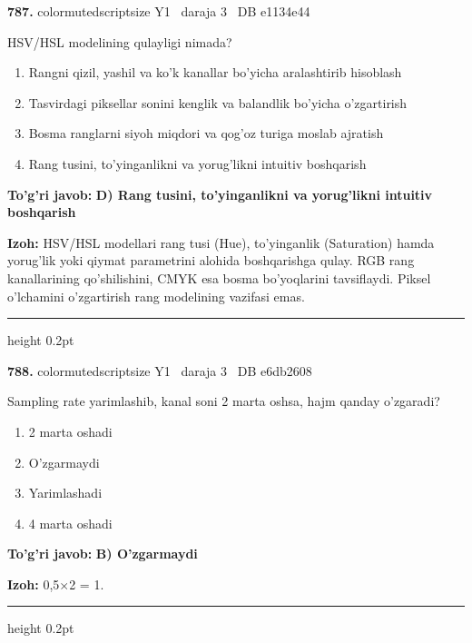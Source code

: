 \documentclass[10pt,a4paper,oneside]{article}
\begin{document}
\noindent\textbf{\color{ink}787.}  {color{muted}scriptsize Y1 \textbullet\ daraja 3 \textbullet\ DB e1134e44}
\par
HSV/HSL modelining qulayligi nimada?
\begin{enumerate}[label=\Alph*),leftmargin=9mm]
\item Rangni qizil, yashil va ko'k kanallar bo'yicha aralashtirib hisoblash
\item Tasvirdagi piksellar sonini kenglik va balandlik bo'yicha o'zgartirish
\item Bosma ranglarni siyoh miqdori va qog'oz turiga moslab ajratish
\item Rang tusini, to'yinganlikni va yorug'likni intuitiv boshqarish
\end{enumerate}
\begin{tcolorbox}[enhanced,breakable,colback=teal!4,colframe=teal!50!black,boxrule=0.5pt,arc=1.1mm,left=3mm,right=3mm,top=1.7mm,bottom=1.7mm,before skip=2mm,after skip=2mm]
\textbf{\color{teal}To'g'ri javob:} \textbf{D) Rang tusini, to'yinganlikni va yorug'likni intuitiv boshqarish}
\par\smallskip
\textbf{Izoh:} HSV/HSL modellari rang tusi (Hue), to'yinganlik (Saturation) hamda yorug'lik yoki qiymat parametrini alohida boshqarishga qulay. RGB rang kanallarining qo'shilishini, CMYK esa bosma bo'yoqlarini tavsiflaydi. Piksel o'lchamini o'zgartirish rang modelining vazifasi emas.
\end{tcolorbox}
\vspace{2mm}\hrule height 0.2pt \vspace{3mm}

\noindent\textbf{\color{ink}788.}  {color{muted}scriptsize Y1 \textbullet\ daraja 3 \textbullet\ DB e6db2608}
\par
Sampling rate yarimlashib, kanal soni 2 marta oshsa, hajm qanday o'zgaradi?
\begin{enumerate}[label=\Alph*),leftmargin=9mm]
\item 2 marta oshadi
\item O'zgarmaydi
\item Yarimlashadi
\item 4 marta oshadi
\end{enumerate}
\begin{tcolorbox}[enhanced,breakable,colback=teal!4,colframe=teal!50!black,boxrule=0.5pt,arc=1.1mm,left=3mm,right=3mm,top=1.7mm,bottom=1.7mm,before skip=2mm,after skip=2mm]
\textbf{\color{teal}To'g'ri javob:} \textbf{B) O'zgarmaydi}
\par\smallskip
\textbf{Izoh:} 0,5\ensuremath{\times}2 = 1.
\end{tcolorbox}
\vspace{2mm}\hrule height 0.2pt \vspace{3mm}
\end{document}
